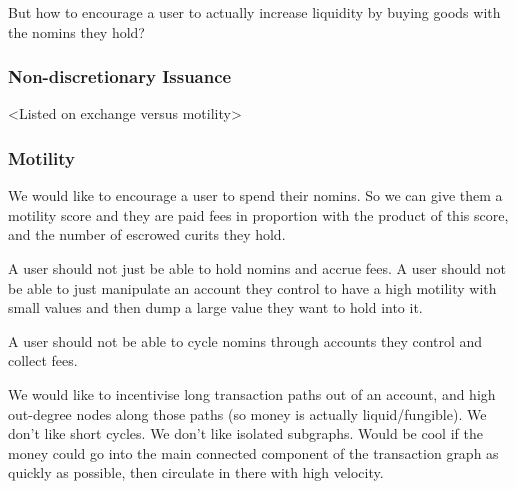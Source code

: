 \documentclass{article}
\begin{document}
But how to encourage a user to actually increase liquidity by buying goods with the nomins they hold? 

\subsubsection{Non-discretionary Issuance}

<Listed on exchange versus motility>



\subsubsection{Motility}

We would like to encourage a user to spend their nomins. So we can give them a motility score 
and they are paid fees in proportion with the product of this score, and the number of escrowed curits
they hold.

A user should not just be able to hold nomins and accrue fees. A user should not be able to just manipulate 
an account they control to have a high motility with small values and then dump a large value they want to hold
into it.

A user should not be able to cycle nomins through accounts they control and collect fees.

We would like to incentivise long transaction paths out of an account, and high out-degree nodes along those paths
(so money is actually liquid/fungible).
We don't like short cycles. We don't like isolated subgraphs. Would be cool if the money could go into the main
connected component of the transaction graph as quickly as possible, then circulate in there with high velocity.
\end{document}
